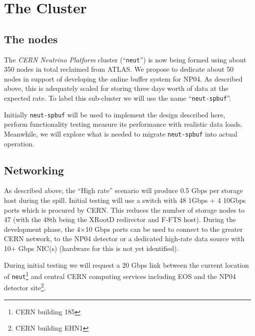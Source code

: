 \documentclass[pdftex,12pt,letter]{article}
\newcommand{\xrd}{XRootD\xspace}
\begin{document}


\section{The Cluster}
\subsection{The nodes}

The \textit{CERN Neutrino Platform} cluster (``\texttt{neut}'') is now being formed using about 350 nodes in
total reclaimed from ATLAS.  We propose to dedicate about 50 nodes in
support of developing the online buffer system for NP04.  
As described above, this is adequately scaled for storing three days worth of
data at the expected rate. To label this sub-cluster we will use the name ``\texttt{neut-spbuf}''.

Initially \texttt{neut-spbuf} will be used to implement the design
described here, perform functionality testing measure its performance
with realistic data loads.  Meanwhile, we will explore what is needed
to migrate \texttt{neut-spbuf} into actual operation.

\subsection{Networking}

As described above, the ``High rate'' scenario will produce 0.5 Gbps
per storage host during the spill.  Initial testing will use a switch
with 48 1Gbps + 4 10Gbps ports which is procured by CERN.  This
reduces the number of storage nodes to 47 (with the 48th being the
\xrd redirector and F-FTS host).  During the development phase, the
4$\times$10 Gbps ports can be used to connect to the greater CERN
network, to the NP04 detector or a dedicated high-rate data source
with 10+ Gbps NIC(s) (hardware for this is not yet identified).

During initial testing we will request a 20 Gbps link between the
current location of \texttt{neut}\footnote{CERN building 185} and
central CERN computing services including EOS and the NP04 detector
site\footnote{CERN building EHN1}.
\end{document}
